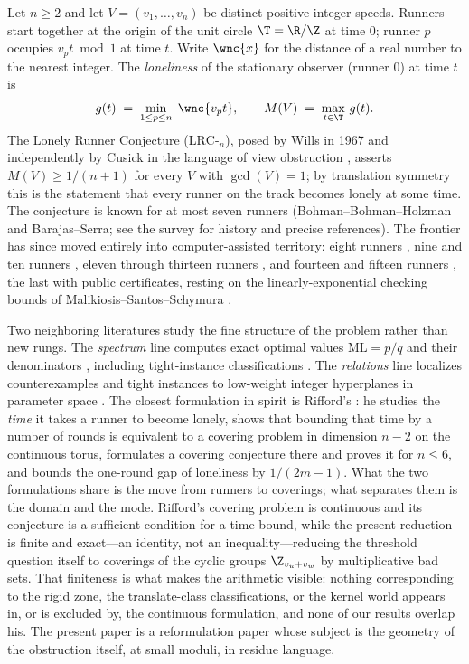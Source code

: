 Let $n\ge 2$ and let $V=(v_1,\dots,v_n)$ be distinct positive integer
speeds. Runners start together at the origin of the unit circle
$\T=\R/\Z$ at time $0$; runner $p$ occupies $v_p t \bmod 1$ at time $t$.
Write $\wnc{x}$ for the distance of a real number to the nearest integer.
The \emph{loneliness} of the stationary observer (runner $0$) at time $t$
is
\[
g(t)\;=\;\min_{1\le p\le n}\;\wnc{v_p t},
\qquad
M(V)\;=\;\max_{t\in\T}\,g(t).
\]
The Lonely Runner Conjecture ($\mathrm{LRC}$-$_n$), posed by Wills in 1967
and independently by Cusick in the language of view obstruction
\cite{PS-survey,Wills}, asserts $M(V)\ge 1/(n{+}1)$ for every $V$ with
$\gcd(V)=1$; by translation symmetry this is the statement that every
runner on the track becomes lonely at some time. The conjecture is known
for at most seven runners (Bohman--Bohman--Holzman and
Barajas--Serra; see the survey \cite{PS-survey} for history and precise
references). The frontier has since moved entirely into computer-assisted
territory: eight runners \cite{Rosenfeld8}, nine and ten runners
\cite{Trakulthongchai}, eleven through thirteen runners
\cite{Sungkawichai}, and fourteen and fifteen runners \cite{Allikvere},
the last with public certificates, resting on the linearly-exponential
checking bounds of Malikiosis--Santos--Schymura \cite{MSS}.

Two neighboring literatures study the fine structure of the problem rather
than new rungs. The \emph{spectrum} line computes exact optimal values
$\mathrm{ML}=p/q$ and their denominators
\cite{Kravitz,FanSun,GiriKravitz,Cordella}, including tight-instance
classifications \cite{Zhang}. The \emph{relations} line localizes
counterexamples and tight instances to low-weight integer hyperplanes in
parameter space \cite{BeckEverett}. The closest formulation in spirit is
Rifford's \cite{Rifford}: he studies the \emph{time} it takes a runner to
become lonely, shows that bounding that time by a number of rounds is
equivalent to a covering problem in dimension $n-2$ on the continuous torus,
formulates a covering conjecture there and proves it for $n\le 6$, and
bounds the one-round gap of loneliness by $1/(2m-1)$. What the two
formulations share is the move from runners to coverings; what separates
them is the domain and the mode. Rifford's covering problem is continuous
and its conjecture is a sufficient condition for a time bound, while the
present reduction is finite and exact---an identity, not an
inequality---reducing the threshold question itself to coverings of the
cyclic groups $\Z_{v_u+v_w}$ by multiplicative bad sets. That finiteness is
what makes the arithmetic visible: nothing corresponding to the rigid zone,
the translate-class classifications, or the kernel world appears in, or is
excluded by, the continuous formulation, and none of our results overlap
his. The present paper is a reformulation paper whose subject is the
geometry of the obstruction itself, at small moduli, in residue language.

